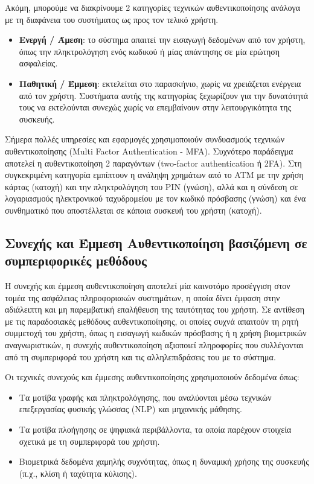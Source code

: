 Ακόμη, μπορούμε να διακρίνουμε 2 κατηγορίες τεχνικών αυθεντικοποίησης ανάλογα με τη διαφάνεια του συστήματος ως προς τον τελικό χρήστη.

\begin{itemize}
    \item \textbf{Ενεργή / Άμεση}: το σύστημα απαιτεί την εισαγωγή δεδομένων από τον χρήστη, όπως την πληκτρολόγηση ενός κωδικού ή μίας απάντησης σε μία ερώτηση ασφαλείας.
    \item \textbf{Παθητική / Έμμεση}: εκτελείται στο παρασκήνιο, χωρίς να χρειάζεται ενέργεια από τον χρήστη. Συστήματα αυτής της κατηγορίας ξεχωρίζουν για την δυνατότητά τους να εκτελούνται συνεχώς χωρίς να επεμβαίνουν στην λειτουργικότητα της συσκευής.
\end{itemize}

Σήμερα πολλές υπηρεσίες και εφαρμογές χρησιμοποιούν συνδυασμούς τεχνικών αυθεντικοποίησης (Multi Factor Authentication - MFA). Συχνότερο παράδειγμα αποτελεί η αυθεντικοποίηση 2 παραγόντων (two-factor authentication ή 2FA). Στη συγκεκριμένη κατηγορία εμπίπτουν η ανάληψη χρημάτων από το ATM με την χρήση κάρτας (κατοχή) και την πληκτρολόγηση του PIN (γνώση), αλλά και η σύνδεση σε λογαριασμούς ηλεκτρονικού ταχυδρομείου με τον κωδικό πρόσβασης (γνώση) και ένα συνθηματικό που αποστέλλεται σε κάποια συσκευή του χρήστη (κατοχή).

\subsection{Συνεχής και Έμμεση Αυθεντικοποίηση βασιζόμενη σε συμπεριφορικές μεθόδους}
Η συνεχής και έμμεση αυθεντικοποίηση αποτελεί μία καινοτόμο προσέγγιση στον τομέα της ασφάλειας πληροφοριακών συστημάτων, η οποία δίνει έμφαση στην αδιάλειπτη και μη παρεμβατική επαλήθευση της ταυτότητας του χρήστη. Σε αντίθεση με τις παραδοσιακές μεθόδους αυθεντικοποίησης, οι οποίες συχνά απαιτούν τη ρητή συμμετοχή του χρήστη, όπως η εισαγωγή κωδικών πρόσβασης ή η χρήση βιομετρικών αναγνωριστικών, η συνεχής αυθεντικοποίηση αξιοποιεί πληροφορίες που συλλέγονται από τη συμπεριφορά του χρήστη και τις αλληλεπιδράσεις του με το σύστημα.

Οι τεχνικές συνεχούς και έμμεσης αυθεντικοποίησης χρησιμοποιούν δεδομένα όπως:
\begin{itemize}
    \item Τα μοτίβα γραφής και πληκτρολόγησης, που αναλύονται μέσω τεχνικών επεξεργασίας φυσικής γλώσσας (NLP) και μηχανικής μάθησης.
    \item Τα μοτίβα πλοήγησης σε ψηφιακά περιβάλλοντα, τα οποία παρέχουν στοιχεία σχετικά με τη συμπεριφορά του χρήστη.
    \item Βιομετρικά δεδομένα χαμηλής συχνότητας, όπως η δυναμική χρήσης της συσκευής (π.χ., κλίση ή ταχύτητα κύλισης).
\end{itemize}

